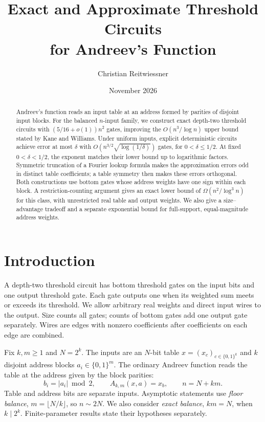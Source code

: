 \documentclass[11pt]{article}
\title{Exact and Approximate Threshold Circuits\\for Andreev's Function}
\author{Christian Reitwiessner}
\date{November 2026}
\newcommand{\bits}{\{0,1\}}
\begin{document}
\maketitle
\begin{abstract}
Andreev's function reads an input table at an address formed by parities
of disjoint input blocks. For the balanced $n$-input family, we construct
exact depth-two threshold circuits with $(5/16+o(1))n^2$ gates, improving
the $O(n^3/\log n)$ upper bound stated by Kane and Williams. Under
uniform inputs, explicit deterministic circuits achieve error at most
$\delta$ with $O(n^{3/2}\sqrt{\log(1/\delta)})$ gates, for
$0<\delta\le1/2$. At fixed $0<\delta<1/2$, the exponent matches
their lower bound up to logarithmic factors. Symmetric truncation of a
Fourier lookup formula makes the approximation errors odd in distinct
table coefficients; a table symmetry then makes these errors orthogonal.
Both constructions use bottom gates whose address weights have one sign
within each block. A restriction-counting argument gives an exact lower
bound of $\Omega(n^2/\log^3 n)$ for this class, with unrestricted real
table and output weights. We also give a size--advantage tradeoff and a
separate exponential bound for full-support, equal-magnitude address weights.
\end{abstract}

\section{Introduction}
A depth-two threshold circuit has bottom threshold gates on the input
bits and one output threshold gate. Each gate outputs one when its
weighted sum meets or exceeds its threshold. We allow arbitrary real
weights and direct input wires to the output. Size counts all gates;
counts of bottom gates add one output gate separately. Wires are edges
with nonzero coefficients after coefficients on each edge are combined.

Fix $k,m\ge1$ and $N=2^k$. The inputs are an $N$-bit table
$x=(x_c)_{c\in\bits^k}$ and $k$ disjoint address blocks $a_i\in\bits^m$.
The ordinary Andreev function reads the table at the address given by
the block parities:
$$
b_i=|a_i|\bmod2,\qquad A_{k,m}(x,a)=x_b,\qquad n=N+km.
$$
Table and address bits are separate inputs. Asymptotic statements use
\emph{floor balance}, $m=\lfloor N/k\rfloor$, so $n\sim2N$.
We also consider \emph{exact balance}, $km=N$, when $k\mid2^k$.
Finite-parameter results state their hypotheses separately.
\end{document}
